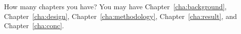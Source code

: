 %
%
%
%
%
%
%
%
%
%
\label{sec:outline}
How many chapters you have? You may have Chapter~\ref{cha:background},
Chapter~\ref{cha:design}, Chapter~\ref{cha:methodology},
Chapter~\ref{cha:result}, and Chapter~\ref{cha:conc}.

